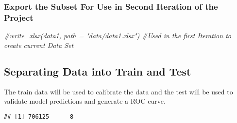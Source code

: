 \documentclass[
]{article}
\newenvironment{Shaded}{\begin{snugshade}}{\end{snugshade}}
\newcommand{\AttributeTok}[1]{\textcolor[rgb]{0.77,0.63,0.00}{#1}}
\newcommand{\CommentTok}[1]{\textcolor[rgb]{0.56,0.35,0.01}{\textit{#1}}}
\newcommand{\ConstantTok}[1]{\textcolor[rgb]{0.00,0.00,0.00}{#1}}
\newcommand{\DecValTok}[1]{\textcolor[rgb]{0.00,0.00,0.81}{#1}}
\newcommand{\FloatTok}[1]{\textcolor[rgb]{0.00,0.00,0.81}{#1}}
\newcommand{\FunctionTok}[1]{\textcolor[rgb]{0.00,0.00,0.00}{#1}}
\newcommand{\NormalTok}[1]{#1}
\newcommand{\OtherTok}[1]{\textcolor[rgb]{0.56,0.35,0.01}{#1}}
\newcommand{\SpecialCharTok}[1]{\textcolor[rgb]{0.00,0.00,0.00}{#1}}
\begin{document}
\hypertarget{export-the-subset-for-use-in-second-iteration-of-the-project}{%
\subsubsection{Export the Subset For Use in Second Iteration of the
Project}\label{export-the-subset-for-use-in-second-iteration-of-the-project}}

\begin{Shaded}
\begin{Highlighting}[]
\CommentTok{\#write\_xlsx(data1, path = "data/data1.xlsx") }
\CommentTok{\#Used in the first Iteration to create current Data Set}
\end{Highlighting}
\end{Shaded}

\hypertarget{separating-data-into-train-and-test}{%
\subsection{Separating Data into Train and
Test}\label{separating-data-into-train-and-test}}

The train data will be used to calibrate the data and the test will be
used to validate model predictions and generate a ROC curve.

\begin{Shaded}
\end{Shaded}

\begin{verbatim}
## [1] 706125      8
\end{verbatim}
\end{document}
